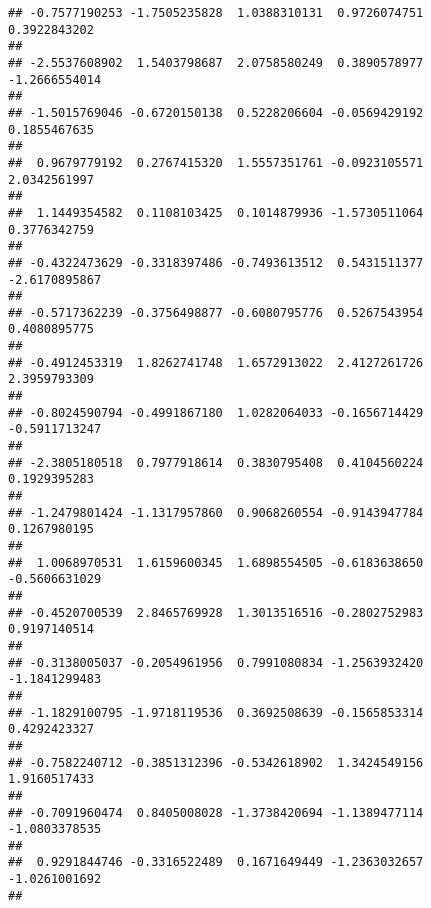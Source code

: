 \documentclass[]{article}
\begin{document}
\begin{verbatim}
## -0.7577190253 -1.7505235828  1.0388310131  0.9726074751  0.3922843202 
##                                                                       
## -2.5537608902  1.5403798687  2.0758580249  0.3890578977 -1.2666554014 
##                                                                       
## -1.5015769046 -0.6720150138  0.5228206604 -0.0569429192  0.1855467635 
##                                                                       
##  0.9679779192  0.2767415320  1.5557351761 -0.0923105571  2.0342561997 
##                                                                       
##  1.1449354582  0.1108103425  0.1014879936 -1.5730511064  0.3776342759 
##                                                                       
## -0.4322473629 -0.3318397486 -0.7493613512  0.5431511377 -2.6170895867 
##                                                                       
## -0.5717362239 -0.3756498877 -0.6080795776  0.5267543954  0.4080895775 
##                                                                       
## -0.4912453319  1.8262741748  1.6572913022  2.4127261726  2.3959793309 
##                                                                       
## -0.8024590794 -0.4991867180  1.0282064033 -0.1656714429 -0.5911713247 
##                                                                       
## -2.3805180518  0.7977918614  0.3830795408  0.4104560224  0.1929395283 
##                                                                       
## -1.2479801424 -1.1317957860  0.9068260554 -0.9143947784  0.1267980195 
##                                                                       
##  1.0068970531  1.6159600345  1.6898554505 -0.6183638650 -0.5606631029 
##                                                                       
## -0.4520700539  2.8465769928  1.3013516516 -0.2802752983  0.9197140514 
##                                                                       
## -0.3138005037 -0.2054961956  0.7991080834 -1.2563932420 -1.1841299483 
##                                                                       
## -1.1829100795 -1.9718119536  0.3692508639 -0.1565853314  0.4292423327 
##                                                                       
## -0.7582240712 -0.3851312396 -0.5342618902  1.3424549156  1.9160517433 
##                                                                       
## -0.7091960474  0.8405008028 -1.3738420694 -1.1389477114 -1.0803378535 
##                                                                       
##  0.9291844746 -0.3316522489  0.1671649449 -1.2363032657 -1.0261001692 
##                                                                       

\end{verbatim}
\end{document}
